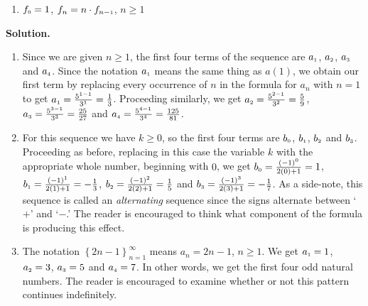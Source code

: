 \begin{ex}
\begin{multicols}{2}
\begin{enumerate}
\item  \label{factorialintroex} $f_{\text{\tiny$0$}} = 1$, $f_{n} =n \cdot f_{n-\text{\tiny$1$}}$, $n \geq 1$

\setcounter{HW}{\value{enumi}}
\end{enumerate}
\end{multicols}



{\bf Solution.}

\begin{enumerate}

\item Since we are given $n \geq 1$, the first four terms of the sequence are  $a_{\text{\tiny$1$}}$, $a_{\text{\tiny$2$}}$, $a_{\text{\tiny$3$}}$ and $a_{\text{\tiny$4$}}$.  Since the notation $a_{\text{\tiny$1$}}$ means the same thing as $a(1)$, we obtain our first term by replacing every occurrence of $n$ in the formula for $a_{n}$ with $n=1$ to get  $a_{\text{\tiny$1$}} = \frac{5^{1-1}}{3^{1}} = \frac{1}{3}$.  Proceeding similarly, we get $a_{\text{\tiny$2$}} = \frac{5^{2-1}}{3^{2}} =\frac{5}{9}$, $a_{\text{\tiny$3$}} = \frac{5^{3-1}}{3^{3}} =\frac{25}{27}$ and $a_{\text{\tiny$4$}} = \frac{5^{4-1}}{3^{4}} =\frac{125}{81}$.  

\item For this sequence we have $k \geq 0$, so the first four terms are $b_{\text{\tiny$0$}}$, $b_{\text{\tiny$1$}}$, $b_{\text{\tiny$2$}}$ and $b_{\text{\tiny$3$}}$.  Proceeding as before, replacing in this case the variable $k$ with the appropriate whole number, beginning with $0$, we get $b_{\text{\tiny$0$}} = \frac{(-1)^{0}}{2(0)+1} = 1$, $b_{\text{\tiny$1$}} = \frac{(-1)^{1}}{2(1)+1} = - \frac{1}{3}$, $b_{\text{\tiny$2$}} = \frac{(-1)^{2}}{2(2)+1} = \frac{1}{5}$ and $b_{\text{\tiny$3$}} =  \frac{(-1)^{3}}{2(3)+1} = -\frac{1}{7}$.  As a side-note, this sequence is called an  \textit{alternating} sequence since the signs alternate between `$+$' and `$-$.' The reader is encouraged to think what component of the formula is producing this effect.

\item  The notation $\left\{ 2n - 1 \right\}_{n=1}^{\infty}$ means  $a_{n} = 2n -1$, $n \geq 1$.  We get $a_{\text{\tiny$1$}} = 1$, $a_{\text{\tiny$2$}} = 3$, $a_{\text{\tiny$3$}} = 5$ and $a_{\text{\tiny$4$}} = 7$.  In other words, we get the first four odd natural numbers.  The reader is encouraged to examine whether or not this pattern continues indefinitely.


\end{enumerate}
\end{ex}
